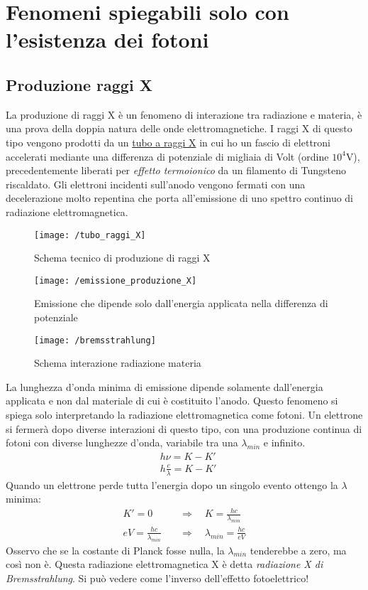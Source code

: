 \section{Fenomeni spiegabili solo con l'esistenza dei fotoni}


\subsection{Produzione raggi X}
La produzione di raggi X è un fenomeno di interazione tra radiazione e materia, è una prova della doppia natura delle onde elettromagnetiche.
I raggi X di questo tipo vengono prodotti da un \underline{tubo a raggi X} in cui ho un fascio di elettroni accelerati mediante una differenza di potenziale di migliaia di Volt (ordine $10^4$V), precedentemente liberati per \textit{effetto termoionico} da un filamento di Tungsteno riscaldato.
Gli elettroni incidenti sull'anodo vengono fermati con una decelerazione molto repentina che porta all'emissione di uno spettro continuo di radiazione elettromagnetica.
\begin{figure}[h]
\centering
\texttt{[image: /tubo\_raggi\_X]}
\caption{Schema tecnico di produzione di raggi X}
\end{figure}
\begin{figure}[h]
\centering
\texttt{[image: /emissione\_produzione\_X]}
\caption{Emissione che dipende solo dall'energia applicata nella differenza di potenziale}
\end{figure}
\begin{figure}[h]
\centering
\texttt{[image: /bremsstrahlung]}
\caption{Schema interazione radiazione materia}
\end{figure}

La lunghezza d'onda minima di emissione dipende solamente dall'energia applicata e non dal materiale di cui è costituito l'anodo.
Questo fenomeno si spiega solo interpretando la radiazione elettromagnetica come fotoni.
Un elettrone si fermerà dopo diverse interazioni di questo tipo, con una produzione continua di fotoni con diverse lunghezze d'onda,
variabile tra una $\lambda_{min}$ e infinito.
\begin{equation}
\begin{split}
& h\nu = K - K' \\
& h \frac{ c}{\lambda } = K - K'
\end{split}
\end{equation}
Quando un elettrone perde tutta l'energia dopo un singolo evento ottengo la $\lambda$ minima:
\begin{equation}
\begin{split}
K' = 0 \quad & \Rightarrow \quad K = \frac{ hc}{\lambda_{min} } \\
eV = \frac{ hc}{\lambda_{min} } \quad & \Rightarrow \quad \lambda_{min} = \frac{ hc}{eV }
\end{split}
\end{equation}
Osservo che se la costante di Planck fosse nulla, la $\lambda_{min}$ tenderebbe a zero, ma così non è.
Questa radiazione elettromagnetica X è detta \textit{radiazione X di Bremsstrahlung}.
Si può vedere come l'inverso dell'effetto fotoelettrico!


